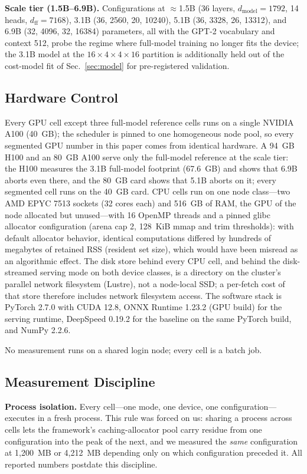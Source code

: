 \documentclass[journal]{IEEEtran}
\begin{document}
\textbf{Scale tier (1.5B--6.9B).} Configurations at ${\approx}$1.5B (36
layers, $d_\text{model}{=}1792$, 14 heads, $d_\text{ff}{=}7168$), 3.1B
(36, 2560, 20, 10240), 5.1B (36, 3328, 26, 13312), and 6.9B (32, 4096, 32,
16384) parameters, all with the GPT-2 vocabulary and context 512, probe the
regime where full-model training no longer fits the device; the 3.1B
model at the $16{\times}4{\times}4{\times}16$ partition is additionally
held out of the cost-model fit of Sec.~\ref{sec:model} for pre-registered
validation.

\subsection{Hardware Control}\label{sec:hw}
Every GPU cell except three full-model reference cells runs on a single
NVIDIA A100 (40~GB); the scheduler is pinned to one homogeneous node pool,
so every segmented GPU number in this paper comes from identical hardware. A 94~GB H100 and an 80~GB A100 serve only the full-model reference at the
scale tier: the H100 measures the 3.1B full-model footprint (67.6~GB) and
shows that 6.9B aborts even there, and the 80~GB card shows that 5.1B
aborts on it; every segmented cell runs on the 40~GB card. CPU cells run on one node class---two AMD EPYC 7513 sockets (32 cores
each) and 516~GB of RAM, the GPU of the node allocated but unused---with 16 OpenMP threads and a pinned glibc allocator configuration (arena cap
2, 128~KiB mmap and trim thresholds): with default allocator behavior,
identical computations differed by hundreds of megabytes of retained RSS (resident set size),
which would have been misread as an algorithmic effect.
The disk store behind every CPU cell, and behind the disk-streamed serving
mode on both device classes, is a directory on the cluster's parallel
network filesystem (Lustre), not a node-local SSD; a per-fetch cost of that store
therefore includes network filesystem access.
The software stack is PyTorch 2.7.0 with CUDA 12.8, ONNX Runtime 1.23.2
(GPU build) for the serving runtime, DeepSpeed 0.19.2 for the baseline on
the same PyTorch build, and NumPy 2.2.6.

No measurement runs
on a shared login node; every cell is a batch job.

\subsection{Measurement Discipline}\label{sec:discipline}
\textbf{Process isolation.} Every cell---one mode, one device, one
configuration---executes in a fresh process. This rule was forced on us:
sharing a process across cells lets the framework's caching-allocator pool
carry residue from one configuration into the peak of the next, and we
measured the \emph{same} configuration at 1{,}200~MB or 4{,}212~MB depending
only on which configuration preceded it. All reported numbers postdate this
discipline.
\end{document}
